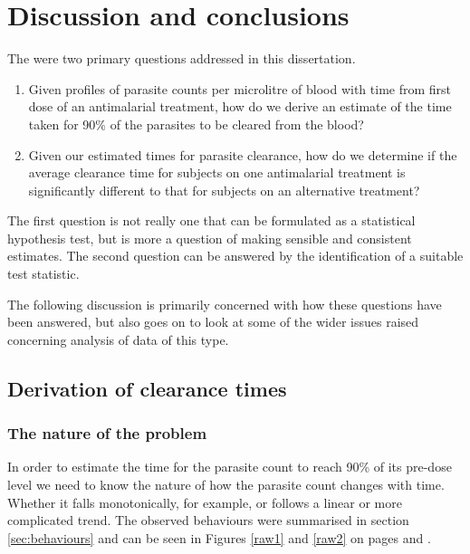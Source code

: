 \chapter{Discussion and conclusions}\label{ch:discussion}
The were two primary questions addressed in this dissertation.
\begin{enumerate}
\item Given profiles of parasite counts per microlitre of blood with time from first dose of an antimalarial treatment, how do we derive an estimate of the time taken for 90\% of the parasites to be cleared from the blood?
\item Given our estimated times for parasite clearance, how do we determine if the average clearance time for subjects on one antimalarial treatment is significantly different to that for subjects on an alternative treatment?
\end{enumerate}
The first question is not really one that can be formulated as a statistical hypothesis test, but is more a question of making sensible and consistent estimates. The second question can be answered by the identification of a suitable test statistic.

The following discussion is primarily concerned with how these questions have been answered, but also goes on to look at some of the wider issues raised concerning analysis of data of this type.

\section{Derivation of clearance times}

\subsection{The nature of the problem}
In order to estimate the time for the parasite count to reach 90\% of its pre-dose level we need to know the nature of how the parasite count changes with time. Whether it falls monotonically, for example, or follows a linear or more complicated trend. The observed behaviours were summarised in section \ref{sec:behaviours} and can be seen in Figures \ref{raw1} and \ref{raw2} on pages \pageref{raw1} and \pageref{raw2}.

